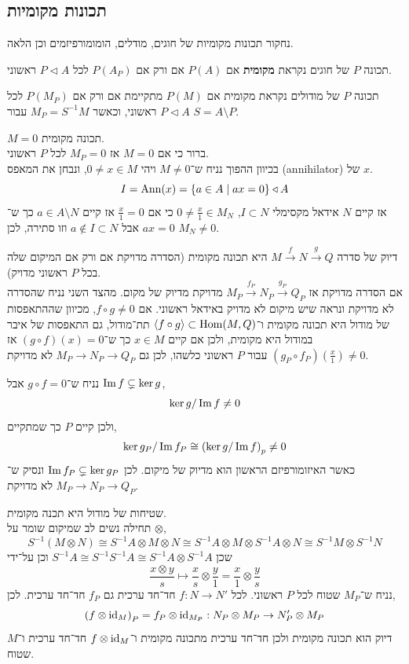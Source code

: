 \subsection{תכונות מקומיות}
נחקור תכונות מקומיות של חוגים, מודלים, הומומורפיזמים וכן הלאה.
\begin{definition}
	תכונה $P$ של חוגים נקראת \textbf{מקומית} אם $P(A)$ אם ורק אם $P(A_P)$ לכל $P \triangleleft A$ ראשוני.
\end{definition}
תכונה $P$ של מודולים נקראת מקומית אם $P(M)$ מתקיימת אם ורק אם $P(M_P)$ לכל $P \triangleleft A$ ראשוני, וכאשר $M_P = S^{-1} M$ עבור $S = A \setminus P$.
\begin{example}
	$M = 0$ תכונה מקומית. \\
	ברור כי אם $M = 0$ אז $M_P = 0$ לכל $P$ ראשוני. \\
	בכיוון ההפוך נניח ש־$M \ne 0$ ויהי $0 \ne x \in M$, ונבחן את המאפס (annihilator) של $x$.
	\[
		I
		= \operatorname{Ann}(x)
		= \{ a \in A \mid a x = 0 \} \triangleleft A
	\]
	אז קיים $N$ אידאל מקסימלי $I \subset N$, $0 \ne \frac{x}{1} \in M_N$ כי אם $\frac{x}{1} = 0$ אז קיים $a \in A \setminus N$ כך ש־$a x = 0$ אבל $a \notin I \subset N$ וזו סתירה, לכן $M_N \ne 0$.
\end{example}
\begin{example}
	דיוק של סדרה $M \xrightarrow{f} N \xrightarrow{g} Q$ היא תכונה מקומית (הסדרה מדויקת אם ורק אם המיקום שלה בכל $P$ ראשוני מדויק). \\
	אם הסדרה מדויקת אז $M_P \xrightarrow{f_P} N_P \xrightarrow{g_P} Q_P$ מדויקת מדיוק של מקום.
	מהצד השני נניח שהסדרה לא מדויקת ונראה שיש מיקום לא מדויק באידאל ראשוני.
	אם $f \circ g \ne 0$, מכיוון שההתאפסות של מודול היא תכונה מקומית ו־$\langle f \circ g \rangle \subset \operatorname{Hom}(M, Q)$ תת־מודול,
	גם התאפסות של איבר במודול היא מקומית, ולכן אם קיים $x \in M$ כך ש־$(g \circ f)(x) = 0$ אז $(g_P \circ f_P)(\frac{x}{1}) \ne 0$ עבור $P$ ראשוני כלשהו,
	לכן גם $M_P \to N_P \to Q_P$ לא מדויקת.

	נניח ש־$g \circ f = 0$ אבל $\operatorname{Im} f \subsetneq \ker g$,
	\[
		\ker g / \operatorname{Im} f \ne 0
	\]
	ולכן קיים $P$ כך שמתקיים,
	\[
		\ker g_P / \operatorname{Im} f_P
		\cong {(\ker g / \operatorname{Im}f)}_p
		\ne 0
	\]
	כאשר האיזומורפיזם הראשון הוא מדיוק של מיקום.
	לכן $\operatorname{Im} f_P \subsetneq \ker g_P$ ונסיק ש־$M_P \to N_P \to Q_P$ לא מדויקת.
\end{example}
\begin{example}
	שטיחות של מודול היא תכנה מקומית. \\
	תחילה נשים לב שמיקום שומר על $\otimes$,
	\[
		S^{-1} (M \otimes N)
		\cong S^{-1} A \otimes M \otimes N
		\cong S^{-1} A \otimes M \otimes S^{-1} A \otimes N
		\cong S^{-1} M \otimes S^{-1} N
	\]
	שכן $S^{-1} A \cong S^{-1} S^{-1} A \cong S^{-1} A \otimes S^{-1} A$ וכן על־ידי
	\[
		\frac{x \otimes y}{s}
		\mapsto \frac{x}{s} \otimes \frac{y}{1}
		= \frac{x}{1} \otimes \frac{y}{s}
	\]
	נניח ש־$M_P$ שטוח לכל $P$ ראשוני.
	לכל $f : N \to N'$ חד־חד ערכית גם $f_P$ חד־חד ערכית.
	לכן,
	\[
		{(f \otimes \operatorname{id}_M)}_P
		= f_P \otimes \operatorname{id}_{M_P} : N_P \otimes M_P \to N_P' \otimes M_P
	\]
	דיוק הוא תכונה מקומית ולכן חד־חד ערכית מתכונה מקומית ו־$f \otimes \operatorname{id}_M$ חד־חד ערכית ו־$M$ שטוח.
\end{example}
